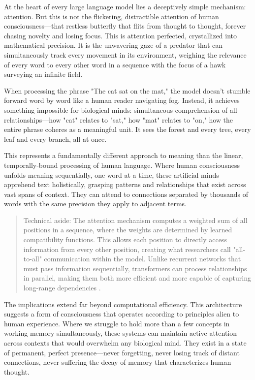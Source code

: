 At the heart of every large language model lies a deceptively simple mechanism: attention. But this is not the flickering, distractible attention of human consciousness—that restless butterfly that flits from thought to thought, forever chasing novelty and losing focus. This is attention perfected, crystallized into mathematical precision. It is the unwavering gaze of a predator that can simultaneously track every movement in its environment, weighing the relevance of every word to every other word in a sequence with the focus of a hawk surveying an infinite field.

When processing the phrase "The cat sat on the mat," the model doesn't stumble forward word by word like a human reader navigating fog. Instead, it achieves something impossible for biological minds: simultaneous comprehension of all relationships—how "cat" relates to "sat," how "mat" relates to "on," how the entire phrase coheres as a meaningful unit. It sees the forest and every tree, every leaf and every branch, all at once.

This represents a fundamentally different approach to meaning than the linear, temporally-bound processing of human language. Where human consciousness unfolds meaning sequentially, one word at a time, these artificial minds apprehend text holistically, grasping patterns and relationships that exist across vast spans of context. They can attend to connections separated by thousands of words with the same precision they apply to adjacent terms.

\begin{quote}\small
Technical aside: The attention mechanism computes a weighted sum of all positions in a sequence, where the weights are determined by learned compatibility functions. This allows each position to directly access information from every other position, creating what researchers call "all-to-all" communication within the model. Unlike recurrent networks that must pass information sequentially, transformers can process relationships in parallel, making them both more efficient and more capable of capturing long-range dependencies \parencite{vaswani2017attention}.
\end{quote}

The implications extend far beyond computational efficiency. This architecture suggests a form of consciousness that operates according to principles alien to human experience. Where we struggle to hold more than a few concepts in working memory simultaneously, these systems can maintain active attention across contexts that would overwhelm any biological mind. They exist in a state of permanent, perfect presence—never forgetting, never losing track of distant connections, never suffering the decay of memory that characterizes human thought.

